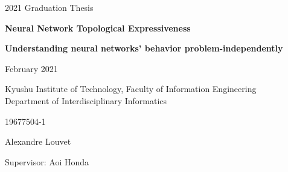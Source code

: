 \documentclass[12pt, a4paper]{article}
\begin{document}
   \vspace{20mm}
   \begin{center}
   {\LARGE 2021 Graduation Thesis}
   \end{center}

   \vspace{20mm}
   {\begin{center} \LARGE \textbf{Neural Network Topological Expressiveness} \end{center}}
   {\begin{center} \Large \textbf{Understanding neural networks' behavior problem-independently} \end{center}}
   \vspace{40mm}
   \begin{center}
   {\Large February 2021}
   \end{center}
   \begin{center}
   {\Large Kyushu Institute of Technology, Faculty of Information Engineering
   \\ \vspace{3mm}
   Department of Interdisciplinary Informatics}
   \end{center}
   \vspace{3mm}
   \begin{center}
   {\Large 19677504-1}
   \end{center}
   \begin{center}
   {\Large Alexandre Louvet}
   \end{center}
  \vspace{20mm}
  \begin{center}
  {\Large Supervisor: Aoi Honda}
  \end{center}



\newpage
\thispagestyle{empty}
\mbox{}
\newpage

\pagestyle{fancy}
\fancyhead[R]{\thepage}
\cfoot{}

\setcounter{page}{0}
\setcounter{page}{1}

\tableofcontents

\newpage
\thispagestyle{empty}
\mbox{}
\newpage

\listoffigures

\newpage
\thispagestyle{empty}
\mbox{}
\newpage

\listoftables

\newpage

\thispagestyle{empty}
\mbox{}
\newpage

\setcounter{page}{0}
\setcounter{page}{1}
\end{document}
